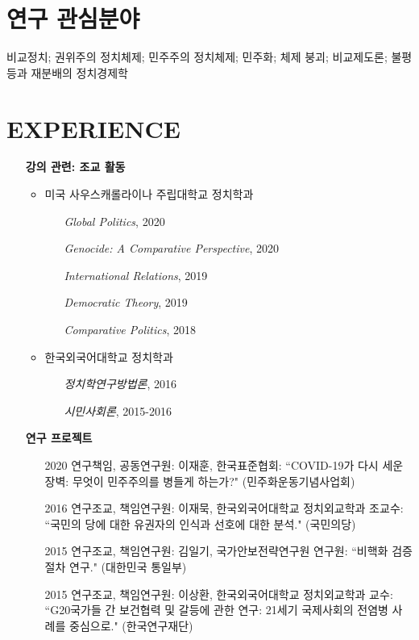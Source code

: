 \documentclass[11pt]{res} %
\begin{document}
\begin{resume}
\section{연구 관심분야}
비교정치; 권위주의 정치체제; 민주주의 정치체제; 민주화; 체제 붕괴; 비교제도론; 불평등과 재분배의 정치경제학

\section{EXPERIENCE}
\begin{itemize}[leftmargin=*]
	\item[] \textbf{강의 관련: 조교 활동}
	\begin{itemize}[leftmargin=*]
		\item 미국 사우스캐롤라이나 주립대학교 정치학과
		\begin{itemize}[leftmargin=*]
			\setlength\itemsep{-0.2em}
			\item[] \textit{Global Politics}, 2020
			\item[] \textit{Genocide: A Comparative Perspective}, 2020
			\item[] \textit{International Relations}, 2019
			\item[] \textit{Democratic Theory}, 2019
			\item[] \textit{Comparative Politics}, 2018
		\end{itemize}
		
		\item 한국외국어대학교 정치학과
		\begin{itemize}[leftmargin=*]
			\setlength\itemsep{-0.2em}
			\item[] \textit{정치학연구방법론}, 2016
			\item[] \textit{시민사회론}, 2015-2016
		\end{itemize}
	\end{itemize}
	
	\item[] \textbf{연구 프로젝트}
	 \begin{itemize}[leftmargin=*]
	 	\item[2020] 연구책임, 공동연구원: 이재훈, 한국표준협회: ``COVID-19가 다시 세운 장벽: 무엇이 민주주의를 병들게 하는가?" (민주화운동기념사업회)
	 	\item[2016] 연구조교, 책임연구원: 이재묵, 한국외국어대학교 정치외교학과 조교수: ``국민의 당에 대한 유권자의 인식과 선호에 대한 분석." (국민의당)
	 	\item[2015] 연구조교, 책임연구원: 김일기, 국가안보전략연구원 연구원: ``비핵화 검증절차 연구." (대한민국 통일부)
	 	\item[2015] 연구조교, 책임연구원: 이상환, 한국외국어대학교 정치외교학과 교수: ``G20국가들 간 보건협력 및 갈등에 관한 연구: 21세기 국제사회의 전염병 사례를 중심으로." (한국연구재단)
	 \end{itemize}
	 

\end{itemize}
\end{resume}
\end{document}
